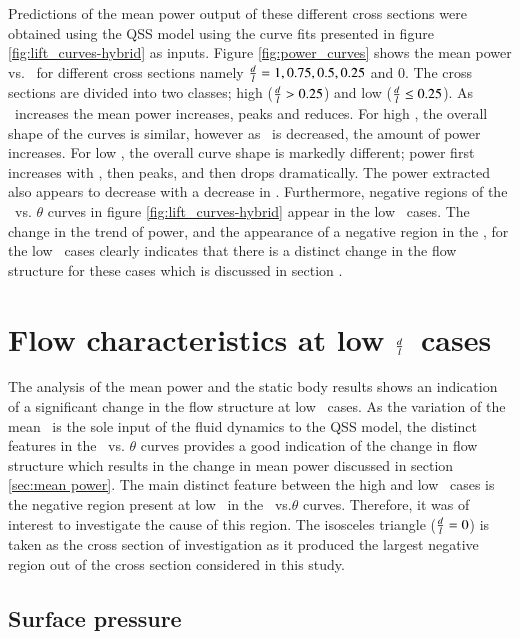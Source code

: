 Predictions of the mean power output of these different cross sections were obtained using the QSS model using the curve fits presented in figure \ref{fig:lift_curves-hybrid} as inputs. Figure \ref{fig:power_curves} shows the mean power vs. \massdamp\ for different cross sections namely $\frac{d}{l}=1,0.75,0.5,0.25$ and $0$. The cross sections are divided into two classes; high ($\frac{d}{l} > 0.25$) and low ($\frac{d}{l} \leq 0.25$). As \massdamp\ increases the mean power increases, peaks and reduces. For high \ratio, the overall shape of the curves is similar, however as \ratio\ is decreased, the amount of power increases. For low \ratio, the overall curve shape is markedly different; power first increases with \massdamp, then peaks, and then drops dramatically. The power extracted also appears to decrease with a decrease in \ratio. Furthermore, negative regions of the \cy\ vs. $\theta$ curves in figure \ref{fig:lift_curves-hybrid} appear in the low \ratio\ cases. The change in the trend of power, and the appearance of a negative region in the \cy, for the low \ratio\ cases clearly indicates that there is a distinct change in the flow structure for these cases which is discussed in section \label{sec:negative-region}.
 
\section{Flow characteristics at low $\frac{d}{l}$\ cases} 

The analysis of the mean power and the static body results shows an indication of a significant change in the flow structure at  low \ratio\ cases. As the variation of the mean \cy\ is the sole input of the fluid dynamics to the QSS model, the distinct features in the \cy\ vs. $\theta$ curves provides a good indication of the change in flow structure which results in the change in mean power discussed in section \ref{sec:mean power}. The main distinct feature between the high and low \ratio\ cases is the negative region present at low \ratio\ in the \cy\ vs.$\theta$ curves. Therefore, it was of interest to investigate the cause of this region. The isosceles triangle ($\frac{d}{l}=0$) is taken as the cross section of investigation as it produced the largest negative region out of the cross section considered in this study.  


\subsection{Surface pressure}
\label{subsec:surface-pressure}

